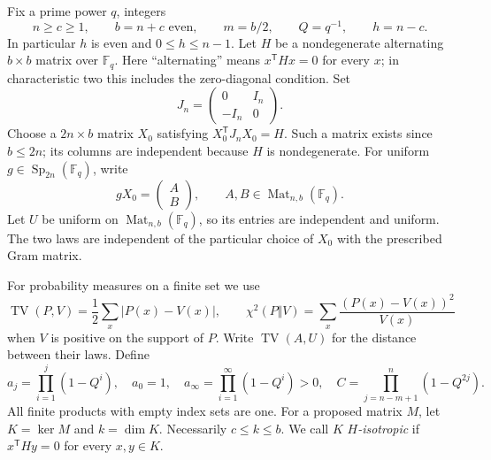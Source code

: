 Fix a prime power $q$, integers
\begin{equation}
  n\ge c\ge1,\qquad b=n+c\text{ even},\qquad m=b/2,
  \qquad Q=q^{-1},\qquad h=n-c.
  \label{symp:eq:parameters}
\end{equation}
In particular $h$ is even and $0\le h\le n-1$.  Let $H$ be a
nondegenerate alternating $b\times b$ matrix over $\mathbb F_q$.  Here
``alternating'' means $x^{\mathsf T}Hx=0$ for every $x$; in characteristic two
this includes the zero-diagonal condition.  Set
\[
 J_n=\begin{pmatrix}0&I_n\\-I_n&0\end{pmatrix}.
\]
Choose a $2n\times b$ matrix $X_0$ satisfying
$X_0^{\mathsf T}J_nX_0=H$.  Such a matrix exists since $b\le2n$; its columns
are independent because $H$ is nondegenerate.  For uniform
$g\in\operatorname{Sp}_{2n}(\mathbb F_q)$, write
\begin{equation}
 gX_0=\begin{pmatrix}A\\B\end{pmatrix},
 \qquad A,B\in\operatorname{Mat}_{n,b}(\mathbb F_q).
 \label{symp:eq:model}
\end{equation}
Let $U$ be uniform on $\operatorname{Mat}_{n,b}(\mathbb F_q)$, so its entries
are independent and uniform.  The two laws are independent of the particular
choice of $X_0$ with the prescribed Gram matrix.

For probability measures on a finite set we use
\[
 \operatorname{TV}(P,V)=\frac12\sum_x|P(x)-V(x)|,
 \qquad
 \chi^2(P\Vert V)=\sum_x\frac{(P(x)-V(x))^2}{V(x)}
\]
when $V$ is positive on the support of $P$.  Write
$\operatorname{TV}(A,U)$ for the distance between their laws.  Define
\begin{equation}
 a_j=\prod_{i=1}^j(1-Q^i),\quad a_0=1,\quad
 a_\infty=\prod_{i=1}^\infty(1-Q^i)>0,\quad
 C=\prod_{j=n-m+1}^{n}(1-Q^{2j}).
 \label{symp:eq:products}
\end{equation}
All finite products with empty index sets are one.  For a proposed matrix
$M$, let $K=\ker M$ and $k=\dim K$.  Necessarily $c\le k\le b$.
We call $K$ \emph{$H$-isotropic} if $x^{\mathsf T}Hy=0$ for every $x,y\in K$.

